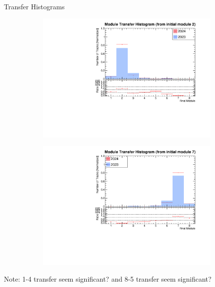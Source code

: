 \begin{frame}{Transfer Histograms}
\begin{figure}
        \begin{subfigure}[t]{0.49\linewidth}
            \includegraphics[width=\linewidth]{./ModuleLevelPlots/final_module_from_st0_module2.pdf}
        \end{subfigure}
        \begin{subfigure}[t]{0.49\linewidth}
            \includegraphics[width=\linewidth]{./ModuleLevelPlots/final_module_from_st0_module7.pdf}
        \end{subfigure}
    \end{figure}
    \vspace{-0.5cm}
    \scriptsize Note: 1-4 transfer seem significant? and 8-5 transfer seem significant?
\end{frame}

